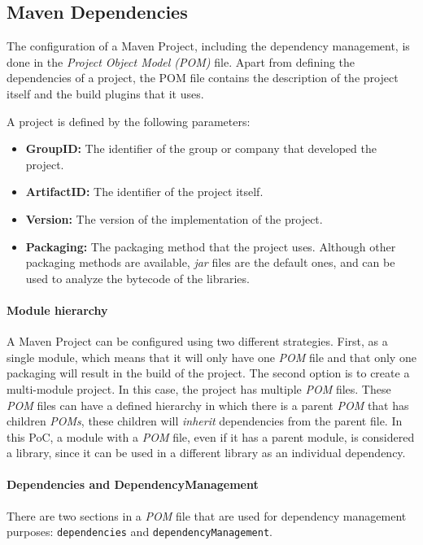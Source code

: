 \subsection{Maven Dependencies}
The configuration of a Maven Project, including the dependency management, is done in the \textit{Project Object Model (POM)} file. Apart from defining the dependencies of a project, the POM file contains the description of the project itself and the build plugins that it uses.

A project is defined by the following parameters:

\begin{itemize}
  \item \textbf{GroupID:} The identifier of the group or company that developed the project.
  \item \textbf{ArtifactID:} The identifier of the project itself.
  \item \textbf{Version:} The version of the implementation of the project.
  \item \textbf{Packaging:} The packaging method that the project uses. Although other packaging methods are available, \textit{jar} files are the default ones, and can be used to analyze the bytecode of the libraries.
\end{itemize}

\paragraph{Module hierarchy}
A Maven Project can be configured using two different strategies. First, as a single module, which means that it will only have one \textit{POM} file and that only one packaging will result in the build of the project. The second option is to create a multi-module project. In this case, the project has multiple \textit{POM} files. These \textit{POM} files can have a defined hierarchy in which there is a parent \textit{POM} that has children \textit{POMs}, these children will \textit{inherit} dependencies from the parent file. In this PoC, a module with a \textit{POM} file, even if it has a parent module, is considered a library, since it can be used in a different library as an individual dependency.

\paragraph{Dependencies and DependencyManagement}
There are two sections in a \textit{POM} file that are used for dependency management purposes: \texttt{dependencies} and \texttt{dependencyManagement}.

